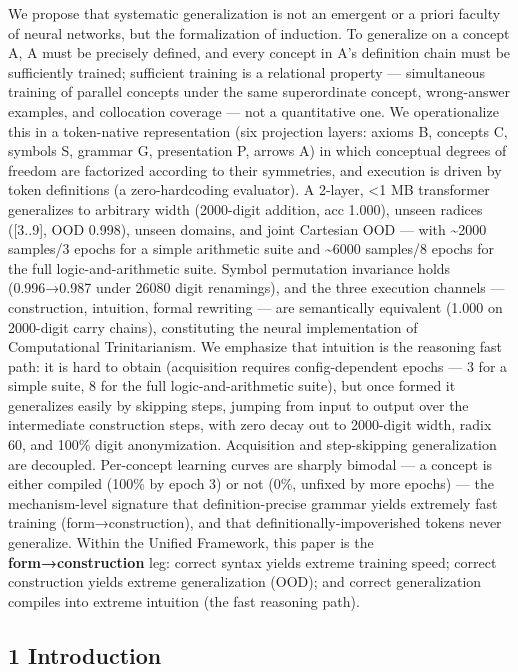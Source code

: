 \documentclass[
]{article}
\begin{document}
We propose that systematic generalization is not an emergent or a priori
faculty of neural networks, but the formalization of induction. To
generalize on a concept A, A must be precisely defined, and every
concept in A's definition chain must be sufficiently trained; sufficient
training is a relational property --- simultaneous training of parallel
concepts under the same superordinate concept, wrong-answer examples,
and collocation coverage --- not a quantitative one. We operationalize
this in a token-native representation (six projection layers: axioms B,
concepts C, symbols S, grammar G, presentation P, arrows A) in which
conceptual degrees of freedom are factorized according to their
symmetries, and execution is driven by token definitions (a
zero-hardcoding evaluator). A 2-layer, \textless1 MB transformer
generalizes to arbitrary width (2000-digit addition, acc 1.000), unseen
radices ({[}3..9{]}, OOD 0.998), unseen domains, and joint Cartesian OOD
--- with \textasciitilde2000 samples/3 epochs for a simple arithmetic
suite and \textasciitilde6000 samples/8 epochs for the full
logic-and-arithmetic suite. Symbol permutation invariance holds
(0.996→0.987 under 26080 digit renamings), and the three execution
channels --- construction, intuition, formal rewriting --- are
semantically equivalent (1.000 on 2000-digit carry chains), constituting
the neural implementation of Computational Trinitarianism. We emphasize
that intuition is the reasoning fast path: it is hard to obtain
(acquisition requires config-dependent epochs --- 3 for a simple suite,
8 for the full logic-and-arithmetic suite), but once formed it
generalizes easily by skipping steps, jumping from input to output over
the intermediate construction steps, with zero decay out to 2000-digit
width, radix 60, and 100\% digit anonymization. Acquisition and
step-skipping generalization are decoupled. Per-concept learning curves
are sharply bimodal --- a concept is either compiled (100\% by epoch 3)
or not (0\%, unfixed by more epochs) --- the mechanism-level signature
that definition-precise grammar yields extremely fast training
(form→construction), and that definitionally-impoverished tokens never
generalize. Within the Unified Framework, this paper is the
\textbf{form→construction} leg: correct syntax yields extreme training
speed; correct construction yields extreme generalization (OOD); and
correct generalization compiles into extreme intuition (the fast
reasoning path).

\subsection{1 Introduction}\label{introduction}
\end{document}
